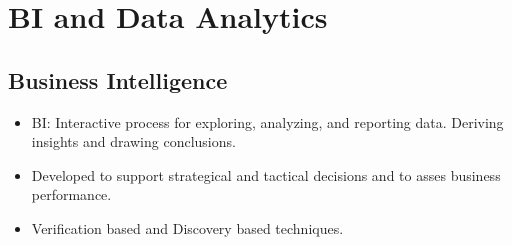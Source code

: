\documentclass[]{report}
\begin{document}
\chapter{BI and Data Analytics}
  \section{Business Intelligence}
    \begin{itemize}
      \item BI: Interactive process for exploring, analyzing, and reporting data. Deriving insights and drawing conclusions.
      \item Developed to support strategical and tactical decisions and to asses business performance.
      \item Verification based and Discovery based techniques.
    \end{itemize}
\end{document}
